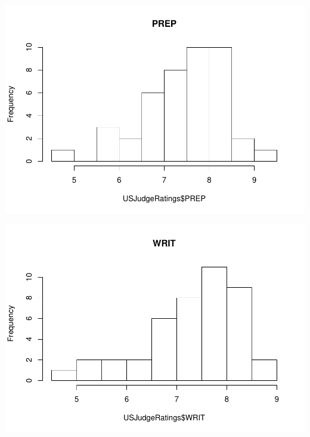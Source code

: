 \documentclass[]{article}
\newenvironment{Shaded}{\begin{snugshade}}{\end{snugshade}}
\newcommand{\DataTypeTok}[1]{\textcolor[rgb]{0.13,0.29,0.53}{#1}}
\newcommand{\KeywordTok}[1]{\textcolor[rgb]{0.13,0.29,0.53}{\textbf{#1}}}
\newcommand{\NormalTok}[1]{#1}
\newcommand{\OperatorTok}[1]{\textcolor[rgb]{0.81,0.36,0.00}{\textbf{#1}}}
\newcommand{\StringTok}[1]{\textcolor[rgb]{0.31,0.60,0.02}{#1}}
\begin{document}
\begin{Shaded}
\end{Shaded}

\includegraphics{Homework_Adrien_Toulouse_Paul-Antoine_Girard_files/figure-latex/unnamed-chunk-6-1.pdf}

\begin{Shaded}
\end{Shaded}

\includegraphics{Homework_Adrien_Toulouse_Paul-Antoine_Girard_files/figure-latex/unnamed-chunk-7-1.pdf}
\end{document}
